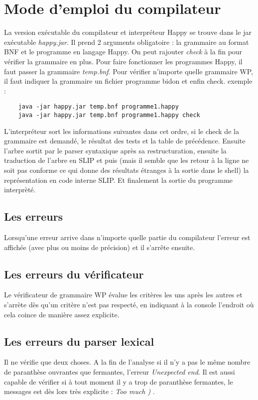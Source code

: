 \chapter{Mode d'emploi du compilateur}
La version exécutable du compilateur et interpréteur Happy se trouve dans le jar exécutable \textit{happy.jar}.
Il prend 2 arguments obligatoire : la grammaire au format BNF et le programme en langage Happy. On peut rajouter \textit{check} à la fin pour vérifier la grammaire en plus.
Pour faire fonctionner les programmes Happy, il faut passer la grammaire \textit{temp.bnf}. Pour vérifier n'importe quelle grammaire WP, il faut indiquer la grammaire
un fichier programme bidon et enfin check.
exemple : \begin{verbatim}
    java -jar happy.jar temp.bnf programme1.happy 
    java -jar happy.jar temp.bnf programme1.happy check
          \end{verbatim}

L'interpréteur sort les informations suivantes dans cet ordre, si le check de la grammaire est demandé, le résultat des tests et la table de précédence.
Ensuite l'arbre sortit par le parser syntaxique après sa restructuration, ensuite la traduction de l'arbre en SLIP et puis (mais il semble que
les retour à la ligne ne soit pas conforme ce qui donne des résultats étranges à la sortie dans le shell) la représentation en code interne SLIP. Et finalement
la sortie du programme interprèté. 


\section{Les erreurs}
Lorsqu'une erreur arrive dans n'importe quelle partie du compilateur l'erreur est affichée (avec plus ou moins de précision) et il s'arrête ensuite.
\section{Les erreurs du vérificateur}
Le vérificateur de grammaire WP évalue les critères les uns après les autres et s'arrète dès qu'un critère n'est pas respecté, en indiquant à la console
l'endroit où cela coince de manière assez explicite.  

\section{Les erreurs du parser lexical}
  Il ne vérifie que deux choses. A la fin de l'analyse si il n'y a pas le même nombre de paranthèse ouvrantes que fermantes, l'erreur \textit{Unexpected end}.
  Il est aussi capable de vérifier si à tout moment il y a trop de paranthèse fermantes, le messages est dès lors très explicite : \textit{Too much ) }.
